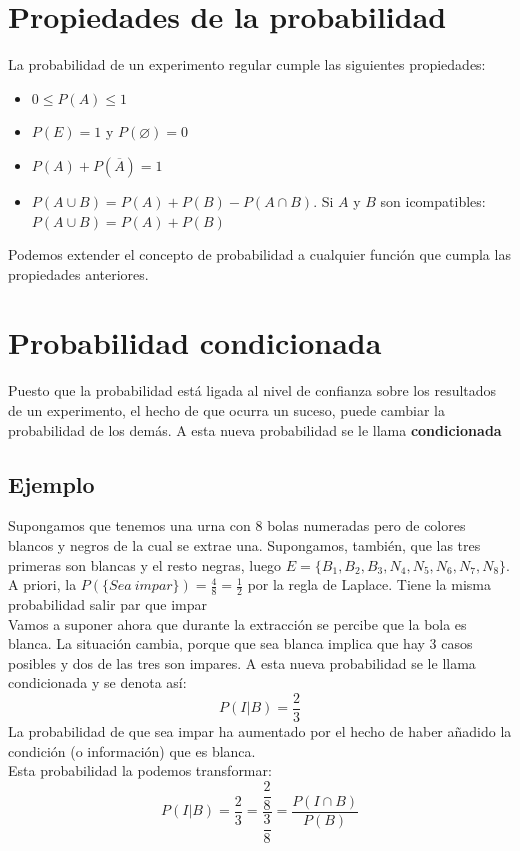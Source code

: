 \documentclass[a4paper,spanish,9pt]{extarticle}
\begin{document}
\begin{multicols*}{2}
\section{Propiedades de la probabilidad} La probabilidad de un experimento regular cumple las siguientes propiedades:
\begin{itemize}
\item $0 \leq P(A) \leq 1$ 
\item $P(E) = 1$ y $P(\varnothing) = 0$
\item $P(A) + P(\overline A) = 1$
\item $P(A \cup B) = P(A) + P(B) - P(A \cap B)$. Si $A$ y $B$ son icompatibles: $P(A \cup B) = P(A) + P(B)$
\end{itemize}
Podemos extender el concepto de probabilidad a cualquier función que cumpla las propiedades anteriores.  

\section{Probabilidad condicionada}

Puesto que la probabilidad está ligada al nivel de confianza sobre los resultados de un experimento, el hecho de que ocurra un suceso, puede cambiar la probabilidad de los demás. A esta nueva probabilidad se le llama \textbf{condicionada}
\subsection{Ejemplo}
 Supongamos que tenemos una urna con 8 bolas numeradas pero de colores blancos y negros de la cual se extrae una. Supongamos, también, que las tres primeras son blancas y el resto negras, luego  $E=\lbrace B_1,B_2, B_3, N_4, N_5, N_6, N_7, N_8\rbrace$.\\
 A priori, la $P(\lbrace Sea\ impar\rbrace )=\frac{4}{8}=\frac{1}{2}$ por la regla de Laplace. Tiene la misma probabilidad salir par que impar\\
 Vamos a suponer ahora que durante la extracción se percibe que la bola es blanca. La situación cambia, porque que sea blanca implica que hay 3 casos posibles y dos de las tres son impares. A esta nueva probabilidad se le llama  condicionada y se denota así:
 $$P(I|B)=\dfrac{2}{3}$$
La probabilidad de que sea impar ha aumentado por el hecho de haber añadido la condición (o información) que es blanca.\\
Esta probabilidad la podemos transformar:
 $$P(I|B)=\dfrac{2}{3}=\dfrac{\dfrac{2}{8}}{\dfrac{3}{8}}=\dfrac{P(I\cap B)}{P(B)}$$


\end{multicols*}
\end{document}
